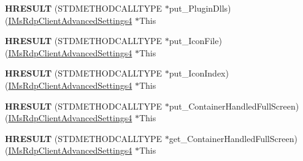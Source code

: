 \begin{DoxyCompactItemize}
\mbox{\label{struct_m_s_t_s_c_lib_1_1_i_ms_rdp_client_advanced_settings4_vtbl_a5f1412bf061e80ccb3e9a84380ac4fab}} 
{\bfseries H\+R\+E\+S\+U\+LT} (S\+T\+D\+M\+E\+T\+H\+O\+D\+C\+A\+L\+L\+T\+Y\+PE $\ast$put\+\_\+\+Plugin\+Dlls)(\hyperlink{interface_m_s_t_s_c_lib_1_1_i_ms_rdp_client_advanced_settings4}{I\+Ms\+Rdp\+Client\+Advanced\+Settings4} $\ast$This
\item 
\mbox{\label{struct_m_s_t_s_c_lib_1_1_i_ms_rdp_client_advanced_settings4_vtbl_a4599f13a41ade334a319e5f36d26cb69}} 
{\bfseries H\+R\+E\+S\+U\+LT} (S\+T\+D\+M\+E\+T\+H\+O\+D\+C\+A\+L\+L\+T\+Y\+PE $\ast$put\+\_\+\+Icon\+File)(\hyperlink{interface_m_s_t_s_c_lib_1_1_i_ms_rdp_client_advanced_settings4}{I\+Ms\+Rdp\+Client\+Advanced\+Settings4} $\ast$This
\item 
\mbox{\label{struct_m_s_t_s_c_lib_1_1_i_ms_rdp_client_advanced_settings4_vtbl_af77a0922b068203e85ee0aa8ec18f52e}} 
{\bfseries H\+R\+E\+S\+U\+LT} (S\+T\+D\+M\+E\+T\+H\+O\+D\+C\+A\+L\+L\+T\+Y\+PE $\ast$put\+\_\+\+Icon\+Index)(\hyperlink{interface_m_s_t_s_c_lib_1_1_i_ms_rdp_client_advanced_settings4}{I\+Ms\+Rdp\+Client\+Advanced\+Settings4} $\ast$This
\item 
\mbox{\label{struct_m_s_t_s_c_lib_1_1_i_ms_rdp_client_advanced_settings4_vtbl_a092b52ceecb57deab8fd4a4e03866367}} 
{\bfseries H\+R\+E\+S\+U\+LT} (S\+T\+D\+M\+E\+T\+H\+O\+D\+C\+A\+L\+L\+T\+Y\+PE $\ast$put\+\_\+\+Container\+Handled\+Full\+Screen)(\hyperlink{interface_m_s_t_s_c_lib_1_1_i_ms_rdp_client_advanced_settings4}{I\+Ms\+Rdp\+Client\+Advanced\+Settings4} $\ast$This
\item 
\mbox{\label{struct_m_s_t_s_c_lib_1_1_i_ms_rdp_client_advanced_settings4_vtbl_afd90571f758abcdf379ca60f247ea48c}} 
{\bfseries H\+R\+E\+S\+U\+LT} (S\+T\+D\+M\+E\+T\+H\+O\+D\+C\+A\+L\+L\+T\+Y\+PE $\ast$get\+\_\+\+Container\+Handled\+Full\+Screen)(\hyperlink{interface_m_s_t_s_c_lib_1_1_i_ms_rdp_client_advanced_settings4}{I\+Ms\+Rdp\+Client\+Advanced\+Settings4} $\ast$This
\item 
\mbox{\label{struct_m_s_t_s_c_lib_1_1_i_ms_rdp_client_advanced_settings4_vtbl_a60806f601769bc17fcf8ae3249026e17}} 

\end{DoxyCompactItemize}
